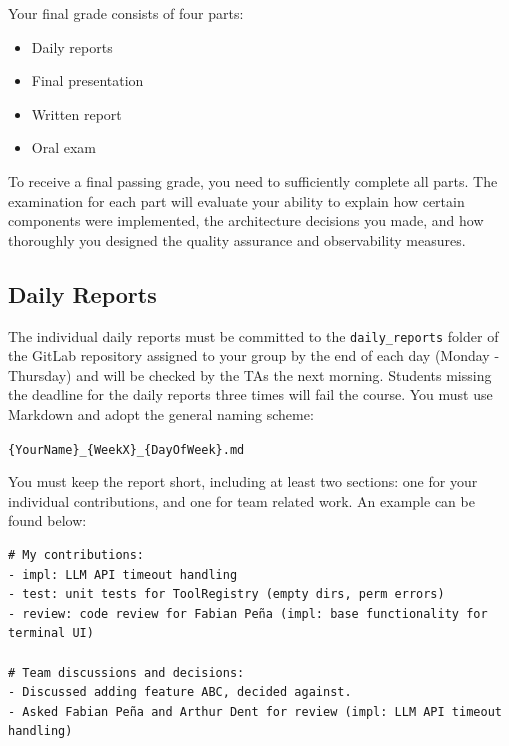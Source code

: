 \documentclass{article}
\begin{document}
Your final grade consists of four parts:

\begin{itemize}
    \item Daily reports
    \item Final presentation
    \item Written report %
    \item Oral exam
\end{itemize}

\noindent To receive a final passing grade, you need to sufficiently complete all parts. The examination for each part will evaluate your ability to explain how certain components were implemented, the architecture decisions you made, and how thoroughly you designed the quality assurance and observability measures.

\subsection{Daily Reports}
\label{sec:daily_report}

The individual daily reports must be committed to the \texttt{daily\_reports} folder of the GitLab repository assigned to your group by the end of each day (Monday - Thursday) and will be checked by the TAs the next morning. Students missing the deadline for the daily reports three times will fail the course. You must use Markdown and adopt the general naming scheme:

\vspace{2mm}
\texttt{\{YourName\}\_\{WeekX\}\_\{DayOfWeek\}.md}
\vspace{2mm}

\noindent You must keep the report short, including at least two sections: one for your individual contributions, and one for team related work. An example can be found below:

\begin{tcolorbox}[fontupper=\ttfamily, title=daily\_reports/LukasSchulte\_Week1\_Tuesday.md]
\begin{verbatim}
# My contributions:
- impl: LLM API timeout handling
- test: unit tests for ToolRegistry (empty dirs, perm errors)
- review: code review for Fabian Peña (impl: base functionality for terminal UI)

# Team discussions and decisions:
- Discussed adding feature ABC, decided against.
- Asked Fabian Peña and Arthur Dent for review (impl: LLM API timeout handling)
\end{verbatim}
\end{tcolorbox}
\end{document}
